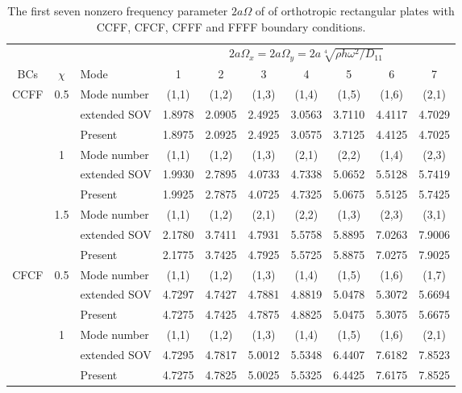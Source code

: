 \documentclass[preprint,12pt]{elsarticle}
\begin{document}
\begin{table}[!htbp] 
	\centering
	\caption{The first seven nonzero frequency parameter $2a\Omega$ of of orthotropic rectangular plates with CCFF, CFCF, CFFF and FFFF boundary conditions.}
	\begin{tabular}{c c l c c c c c c c}
		\toprule
		\multicolumn{3}{c}{} & \multicolumn{7}{c}{$2a\Omega_x=2a\Omega_y=2a\sqrt[4]{\rho h \omega^2/D_{11}}$} \\ 
		\cmidrule(lr){4-10}
		BCs & $\chi$ & Mode & 1 & 2 & 3 & 4 & 5 & 6 & 7 \\
		\midrule
		CCFF & 0.5 & Mode number   & (1,1) & (1,2) & (1,3) & (1,4) & (1,5) & (1,6) & (2,1) \\
		&     & extended SOV \Citealp{xing2020extended}   & 1.8978 & 2.0905 & 2.4925 & 3.0563 & 3.7110 & 4.4117 & 4.7029 \\
		&     & Present       & 1.8975 & 2.0925 & 2.4925 & 3.0575 & 3.7125 & 4.4125 & 4.7025 \\
		& 1   & Mode number  & (1,1) & (1,2) & (1,3) & (2,1) & (2,2) & (1,4) & (2,3) \\
		&     & extended SOV \Citealp{xing2020extended}   & 1.9930 & 2.7895 & 4.0733 & 4.7338 & 5.0652 & 5.5128 & 5.7419 \\
		&     & Present       & 1.9925 & 2.7875 & 4.0725 & 4.7325 & 5.0675 & 5.5125 & 5.7425 \\
		& 1.5 & Mode number  & (1,1) & (1,2) & (2,1) & (2,2) & (1,3) & (2,3) & (3,1) \\
		&     & extended SOV \Citealp{xing2020extended}   & 2.1780 & 3.7411 & 4.7931 & 5.5758 & 5.8895 & 7.0263 & 7.9006 \\
		&     & Present       & 2.1775 & 3.7425 & 4.7925 & 5.5725 & 5.8875 & 7.0275 & 7.9025 \\
		CFCF & 0.5 & Mode number   & (1,1) & (1,2) & (1,3) & (1,4) & (1,5) & (1,6) & (1,7) \\
		&     & extended SOV \Citealp{xing2020extended}   & 4.7297 & 4.7427 & 4.7881 & 4.8819 & 5.0478 & 5.3072 & 5.6694 \\
		&     & Present       & 4.7275 & 4.7425 & 4.7875 & 4.8825 & 5.0475 & 5.3075 & 5.6675 \\
		& 1   & Mode number  & (1,1) & (1,2) & (1,3) & (1,4) & (1,5) & (1,6) & (2,1) \\
		&     & extended SOV \Citealp{xing2020extended}   & 4.7295 & 4.7817 & 5.0012 & 5.5348 & 6.4407 & 7.6182 & 7.8523 \\
		&     & Present       & 4.7275 & 4.7825 & 5.0025 & 5.5325 & 6.4425 & 7.6175 & 7.8525 \\

\end{tabular}
\end{table}
\end{document}
